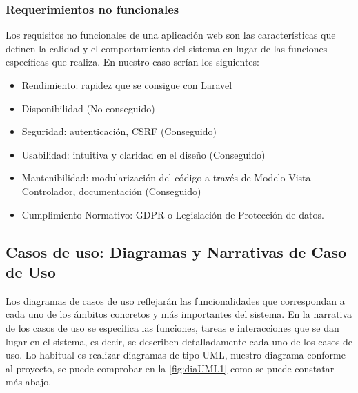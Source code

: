 \documentclass{article}
\begin{document}
\subsubsection{Requerimientos no funcionales}
Los requisitos no funcionales de una aplicación web son las características que definen la calidad y el comportamiento del sistema en lugar de las funciones específicas que realiza. En nuestro caso serían los siguientes:\\
\begin{itemize}
    \item Rendimiento: rapidez que se consigue con Laravel 
    \item Disponibilidad (No conseguido)
    \item Seguridad: autenticación, CSRF (Conseguido)
    \item Usabilidad: intuitiva y claridad en el diseño (Conseguido)
    \item Mantenibilidad: modularización del código a través de Modelo Vista Controlador, documentación (Conseguido)
    \item Cumplimiento Normativo: GDPR o Legislación de Protección de datos.
\end{itemize}
\subsection{Casos de uso: Diagramas y Narrativas de Caso de Uso}
Los diagramas de casos de uso reflejarán las funcionalidades que correspondan a cada uno de los ámbitos concretos y más importantes del sistema. En la narrativa de los casos de uso se especifica las funciones, tareas e interacciones que se dan lugar en el sistema, es decir, se describen detalladamente cada uno de los casos de uso.
Lo habitual es realizar diagramas de tipo UML, nuestro diagrama conforme al proyecto, se puede comprobar en la \ref{fig:diaUML1} como se puede constatar más abajo.
\end{document}
